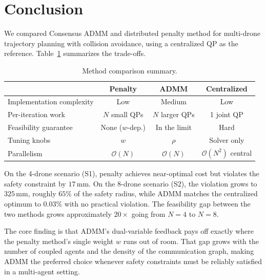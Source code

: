 \documentclass[11pt,onecolumn]{article}
\begin{document}
\section{Conclusion}
\label{sec:conclusion}

We compared Consensus ADMM and distributed penalty method for multi-drone trajectory
planning with collision avoidance, using a centralized QP as the reference.
Table~\ref{tab:summary} summarizes the trade-offs.

\begin{table}[h]
  \centering
  \caption{Method comparison summary.}
  \label{tab:summary}
  \begin{tabular}{@{}lccc@{}}
    \toprule
                              & \textbf{Penalty} & \textbf{ADMM} & \textbf{Centralized} \\
    \midrule
    Implementation complexity & Low              & Medium        & Low \\
    Per-iteration work        & $N$ small QPs    & $N$ larger QPs & 1 joint QP \\
    Feasibility guarantee     & None ($w$-dep.)  & In the limit  & Hard \\
    Tuning knobs              & $w$              & $\rho$        & Solver only \\
    Parallelism               & $\mathcal{O}(N)$ & $\mathcal{O}(N)$ & $\mathcal{O}(N^2)$ central \\
    \bottomrule
  \end{tabular}
\end{table}

On the 4-drone scenario (S1), penalty achieves near-optimal cost but  violates
the safety constraint by $17\,\text{mm}$.  On the 8-drone scenario (S2), the violation
grows to $325\,\text{mm}$, roughly $65\%$ of the safety radius, while ADMM matches
the centralized optimum to $0.03\%$ with no practical violation.  The feasibility gap
between the two methods grows approximately $20\times$ going from $N=4$ to $N=8$.

The core finding is that ADMM's dual-variable feedback pays off exactly where the penalty
method's single weight $w$ runs out of room.  That gap grows with the number of coupled
agents and the density of the communication graph, making ADMM the preferred choice
whenever safety constraints must be reliably satisfied in a multi-agent setting.
\end{document}
